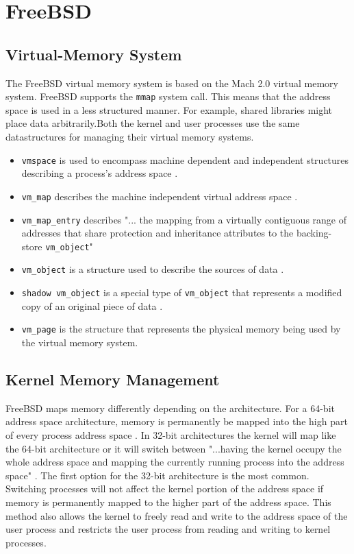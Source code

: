 \section{FreeBSD}
\subsection{Virtual-Memory System}
The FreeBSD virtual memory system is based on the Mach 2.0 virtual memory system\cite{Freebsdtext}. FreeBSD supports the \lstinline{mmap} system call. This means that the address space is used in a less structured manner. For example, shared libraries might place data arbitrarily.Both the kernel and user processes use the same datastructures for managing their virtual memory systems.
\begin{itemize}
    \item \lstinline{vmspace} is used to encompass machine dependent and independent structures describing a process's address space \cite{Freebsdtext}.
    \item \lstinline{vm_map} describes the machine independent virtual address space \cite{Freebsdtext}.
    \item \lstinline{vm_map_entry} describes "... the mapping from a virtually contiguous range of addresses that share protection and inheritance attributes to the backing-store \lstinline{vm_object}"\cite{Freebsdtext}
    \item \lstinline{vm_object} is a structure used to describe the sources of data \cite{Freebsdtext}.
    \item \lstinline{shadow vm_object} is a special type of \lstinline{vm_object} that represents a modified copy of an original piece of data \cite{Freebsdtext}.
    \item \lstinline{vm_page} is the structure that represents the physical memory being used by the virtual memory system.
\end{itemize}

\subsection{Kernel Memory Management}
FreeBSD maps memory differently depending on the architecture. For a 64-bit address space architecture, memory is permanently be mapped into the high part of every process address space \cite{Freebsdtext}. In 32-bit architectures the kernel will map like the 64-bit architecture or it will switch between "...having the kernel occupy the whole address space and mapping the currently running process into the address space" \cite{Freebsdtext}. The first option for the 32-bit architecture is the most common. Switching processes will not affect the kernel portion of the address space if memory is permanently mapped to the higher part of the address space\cite{Freebsdtext}. This method also allows the kernel to freely read and write to the address space of the user process and restricts the user process from reading and writing to kernel processes\cite{Freebsdtext}.

